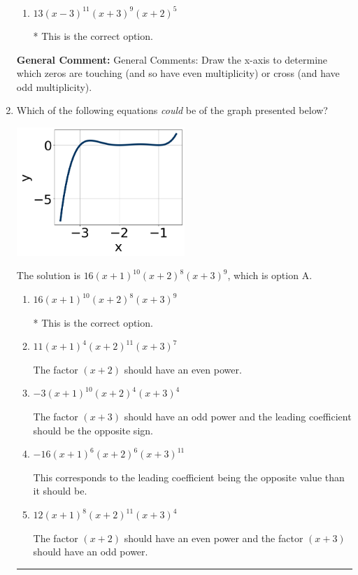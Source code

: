 \documentclass{extbook}[14pt]
\newcommand{\litem}[1]{\item #1

\rule{\textwidth}{0.4pt}}
\begin{document}
\begin{enumerate}
{\begin{enumerate}[label=\Alph*.]
The factors $3$ and $-3$ have have been odd power.
\item \( 13(x - 3)^{11} (x + 3)^{9} (x + 2)^{5} \)

* This is the correct option.
\end{enumerate}

\textbf{General Comment:} General Comments: Draw the x-axis to determine which zeros are touching (and so have even multiplicity) or cross (and have odd multiplicity).
}
\litem{
Which of the following equations \textit{could} be of the graph presented below?

\begin{center}
    \includegraphics[width=0.5\textwidth]{../Figures/polyGraphToFunctionA.png}
\end{center}




The solution is \( 16(x + 1)^{10} (x + 2)^{8} (x + 3)^{9} \), which is option A.\begin{enumerate}[label=\Alph*.]
\item \( 16(x + 1)^{10} (x + 2)^{8} (x + 3)^{9} \)

* This is the correct option.
\item \( 11(x + 1)^{4} (x + 2)^{11} (x + 3)^{7} \)

The factor $(x + 2)$ should have an even power.
\item \( -3(x + 1)^{10} (x + 2)^{4} (x + 3)^{4} \)

The factor $(x + 3)$ should have an odd power and the leading coefficient should be the opposite sign.
\item \( -16(x + 1)^{6} (x + 2)^{6} (x + 3)^{11} \)

This corresponds to the leading coefficient being the opposite value than it should be.
\item \( 12(x + 1)^{8} (x + 2)^{11} (x + 3)^{4} \)

The factor $(x + 2)$ should have an even power and the factor $(x + 3)$ should have an odd power.
\end{enumerate}

}
\end{enumerate}
\end{document}
